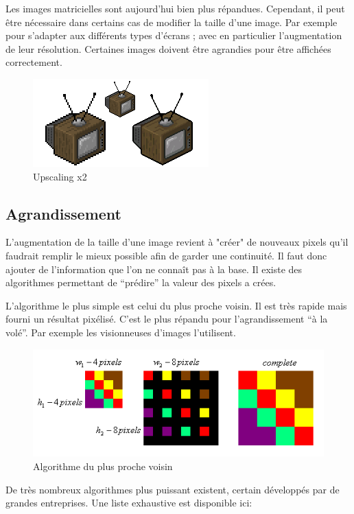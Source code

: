 \documentclass[12pt, a4paper]{article}
\begin{document}
Les images matricielles sont aujourd'hui bien plus répandues. Cependant, il peut être nécessaire dans certains cas de modifier la taille d'une image. Par exemple pour s'adapter aux différents types d'écrans ; avec en particulier l'augmentation de leur résolution. Certaines images doivent être agrandies pour être affichées correctement.

\begin{figure}[h!]
  \centering
  \includegraphics[scale=0.7]{Images/tele.png}
  \caption{Upscaling x2}
\end{figure}

\subsection{Agrandissement}
 
L'augmentation de la taille d'une image revient à "créer" de nouveaux pixels qu'il faudrait remplir le mieux possible afin de garder une continuité. Il faut donc ajouter de l'information que l'on ne connaît pas à la base. Il existe des algorithmes permettant de ``prédire'' la valeur des pixels a crées.

L'algorithme le plus simple est celui du plus proche voisin. Il est très rapide mais fourni un résultat pixélisé. C'est le plus répandu pour l'agrandissement ``à la volé''. Par exemple les visionneuses d'images l'utilisent.

\begin{figure}[h!]
  \centering
  \includegraphics[scale=0.6]{Images/plus_proche_voisin.png}
  \caption{Algorithme du plus proche voisin}
\end{figure}

De très nombreux algorithmes plus puissant existent, certain développés par de grandes entreprises. Une liste exhaustive est disponible ici:
\end{document}
